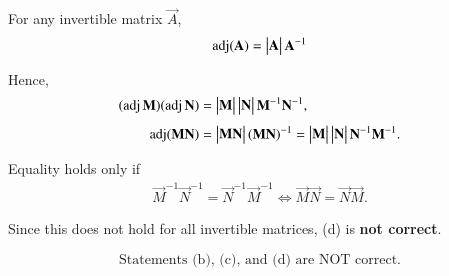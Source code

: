 \documentclass[12pt]{article}
\begin{document}
For any invertible matrix $\vec{A}$,
\begin{align}
\operatorname{adj}(\mathbf{A}) = \begin{vmatrix}\mathbf{A}\end{vmatrix} \mathbf{A}^{-1}
\end{align}

Hence,
\begin{align}
(\operatorname{adj}\mathbf{M})(\operatorname{adj}\mathbf{N}) &= \begin{vmatrix}\mathbf{M}\end{vmatrix}\begin{vmatrix}\mathbf{N}\end{vmatrix}\mathbf{M}^{-1}\mathbf{N}^{-1}, \\[4pt]
\operatorname{adj}(\mathbf{M}\mathbf{N}) &= \begin{vmatrix}\mathbf{M}\mathbf{N}\end{vmatrix}(\mathbf{M}\mathbf{N})^{-1} = \begin{vmatrix}\mathbf{M}\end{vmatrix}\begin{vmatrix}\mathbf{N}\end{vmatrix} \mathbf{N}^{-1}\mathbf{M}^{-1}.
\end{align}

Equality holds only if  
\begin{align}
\vec{M}^{-1}\vec{N}^{-1} = \vec{N}^{-1}\vec{M}^{-1} \iff \vec{M}\vec{N} = \vec{N}\vec{M}.
\end{align}

Since this does not hold for all invertible matrices, (d) is \textbf{not correct}.

\[
\boxed{\text{Statements (b), (c), and (d) are NOT correct.}}
\]
\end{document}
